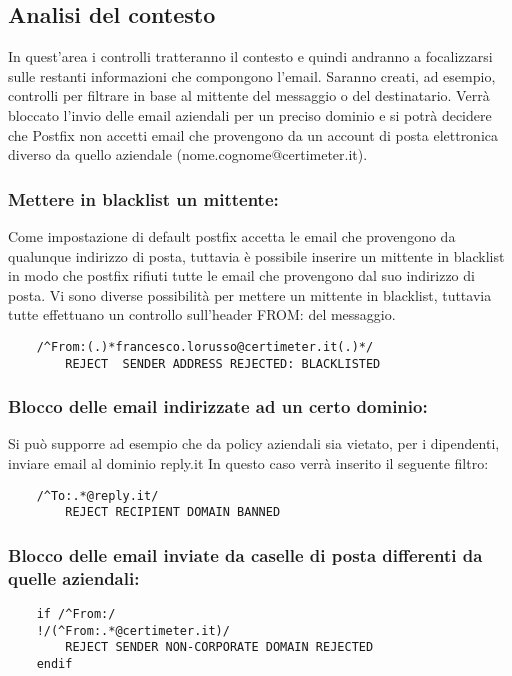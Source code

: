     \subsection{Analisi del contesto}
    In quest’area i controlli tratteranno il contesto e quindi andranno a focalizzarsi sulle restanti 
    informazioni che compongono l’email. Saranno creati, ad esempio, controlli per filtrare in base al 
    mittente del messaggio o del destinatario. 
    Verrà bloccato l’invio delle email aziendali per un preciso dominio e si potrà decidere che Postfix 
    non accetti email che provengono da un account di posta elettronica diverso da quello aziendale 
    (nome.cognome@certimeter.it). 

    \subsubsection{Mettere in blacklist un mittente:}
    Come impostazione di default postfix accetta le email che provengono da qualunque indirizzo di posta, 
    tuttavia è possibile inserire un mittente in blacklist in modo che postfix rifiuti tutte le email che 
    provengono dal suo indirizzo di posta. Vi sono diverse possibilità per mettere un mittente in blacklist, 
    tuttavia tutte effettuano un controllo sull’header FROM: del messaggio.

    \begin{verbatim}
    /^From:(.)*francesco.lorusso@certimeter.it(.)*/
        REJECT  SENDER ADDRESS REJECTED: BLACKLISTED
    \end{verbatim}

    \subsubsection{Blocco delle email indirizzate ad un certo dominio:}
    Si può supporre ad esempio che da policy aziendali sia vietato, per i dipendenti, 
    inviare email al dominio reply.it In questo caso verrà inserito il seguente filtro:

    \begin{verbatim}
    /^To:.*@reply.it/
        REJECT RECIPIENT DOMAIN BANNED
    \end{verbatim}

    \subsubsection{Blocco delle email inviate da caselle di posta differenti da quelle aziendali:}
    \begin{verbatim}
    if /^From:/
    !/(^From:.*@certimeter.it)/ 
        REJECT SENDER NON-CORPORATE DOMAIN REJECTED
    endif
    \end{verbatim}

